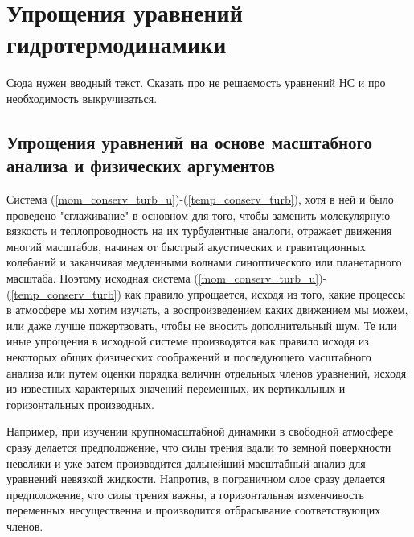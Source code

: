 \chapter{Упрощения уравнений гидротермодинамики}
    \begin{warn}
    Сюда нужен вводный текст. Сказать про не решаемость уравнений НС и про необходимость выкручиваться. 
    \end{warn}

\section{Упрощения уравнений на основе масштабного анализа и физических аргументов}

Система (\ref{mom_conserv_turb_u})-(\ref{temp_conserv_turb}), хотя в ней и было проведено "сглаживание" в основном для того, чтобы заменить молекулярную вязкость и теплопроводность на их турбулентные аналоги, отражает движения многий масштабов, начиная от быстрый акустических и гравитационных колебаний и заканчивая медленными волнами синоптического или планетарного масштаба. Поэтому исходная система (\ref{mom_conserv_turb_u})-(\ref{temp_conserv_turb}) как правило упрощается, исходя из того, какие процессы в атмосфере мы хотим изучать, а воспроизведением каких движением мы можем, или даже лучше пожертвовать, чтобы не вносить дополнительный шум. Те или иные упрощения в исходной системе производятся как правило исходя из некоторых общих физических соображений и последующего масштабного анализа или путем оценки порядка величин отдельных членов уравнений, исходя из известных характерных значений переменных, их вертикальных и горизонтальных производных.


Например, при изучении крупномасштабной динамики в свободной атмосфере сразу делается предположение, что силы трения вдали то земной поверхности невелики и уже затем производится дальнейший масштабный анализ для уравнений невязкой жидкости. Напротив, в пограничном слое сразу делается предположение, что силы трения важны, а горизонтальная изменчивость переменных несущественна и производится отбрасывание соответствующих членов.

